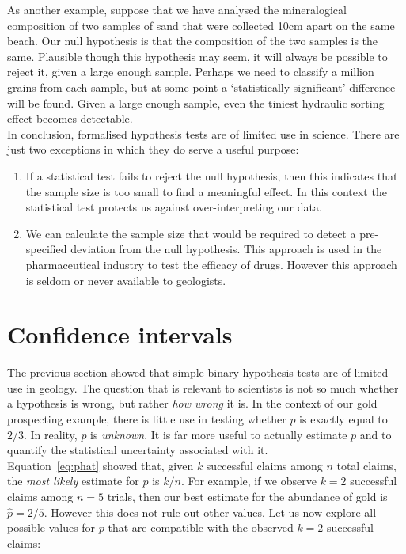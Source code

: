 As another example, suppose that we have analysed the mineralogical
composition of two samples of sand that were collected 10cm apart on
the same beach. Our null hypothesis is that the composition of the two
samples is the same. Plausible though this hypothesis may seem, it
will always be possible to reject it, given a large enough
sample. Perhaps we need to classify a million grains from each sample,
but at some point a `statistically significant' difference will be
found. Given a large enough sample, even the tiniest hydraulic sorting
effect becomes detectable.\\

In conclusion, formalised hypothesis tests are of limited use in
science.  There are just two exceptions in which they do serve a
useful purpose:

\begin{enumerate}
\item If a statistical test fails to reject the null hypothesis, then
  this indicates that the sample size is too small to find a
  meaningful effect. In this context the statistical test protects
  us against over-interpreting our data.
\item We can calculate the sample size that would be required to
  detect a pre-specified deviation from the null hypothesis.  This
  approach is used in the pharmaceutical industry to test the efficacy
  of drugs. However this approach is seldom or never available to
  geologists.
\end{enumerate}

\section{Confidence intervals}
\label{sec:binomCI}

The previous section showed that simple binary hypothesis tests are of
limited use in geology. The question that is relevant to scientists is
not so much whether a hypothesis is wrong, but rather \emph{how wrong}
it is. In the context of our gold prospecting example, there is little
use in testing whether $p$ is exactly equal to $2/3$. In reality, $p$
is \emph{unknown}. It is far more useful to actually estimate $p$ and
to quantify the statistical uncertainty associated with it.\\

Equation~\ref{eq:phat} showed that, given $k$ successful claims among
$n$ total claims, the \emph{most likely} estimate for $p$ is $k/n$.
For example, if we observe $k=2$ successful claims among $n=5$ trials,
then our best estimate for the abundance of gold is $\hat{p}=2/5$.
However this does not rule out other values. Let us now explore all
possible values for $p$ that are compatible with the observed $k=2$
successful claims:

